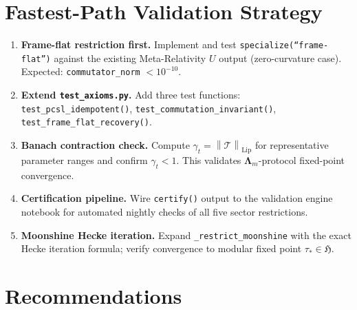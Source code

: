 \documentclass[12pt,a4paper]{article}
\theoremstyle{plain}
\theoremstyle{definition}
\theoremstyle{remark}
\newcommand{\Lam}{\boldsymbol{\Lambda}_m}
\newcommand{\norm}[1]{\left\lVert #1 \right\rVert}
\begin{document}
\section{Fastest-Path Validation Strategy}
\label{sec:validation}

\begin{enumerate}[leftmargin=*, label=\textbf{Step \arabic*.}]
  \item \textbf{Frame-flat restriction first.}
        Implement and test \texttt{specialize(``frame-flat'')} against the
        existing Meta-Relativity $U$ output (zero-curvature case).
        Expected: \texttt{commutator\_norm} $< 10^{-10}$.

  \item \textbf{Extend \texttt{test\_axioms.py}.}
        Add three test functions:
        \texttt{test\_pcsl\_idempotent()},
        \texttt{test\_commutation\_invariant()},
        \texttt{test\_frame\_flat\_recovery()}.

  \item \textbf{Banach contraction check.}
        Compute $\gamma_t = \norm{\mathcal{T}}_{\mathrm{Lip}}$ for
        representative parameter ranges and confirm $\gamma_t < 1$.
        This validates $\Lam$-protocol fixed-point convergence.

  \item \textbf{Certification pipeline.}
        Wire \texttt{certify()} output to the validation engine notebook
        for automated nightly checks of all five sector restrictions.

  \item \textbf{Moonshine Hecke iteration.}
        Expand \texttt{\_restrict\_moonshine} with the exact Hecke
        iteration formula; verify convergence to modular fixed point
        $\tau_* \in \mathfrak{H}$.
\end{enumerate}

\section{Recommendations}
\label{sec:recs}
\end{document}
